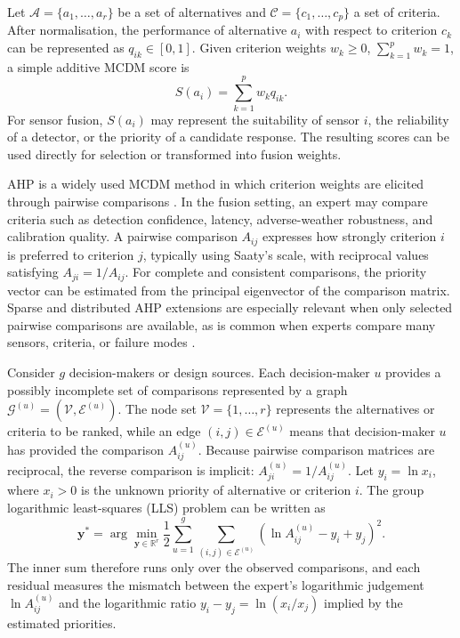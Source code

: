 \documentclass{ieeeaccess}
\begin{document}
Let \(\mathcal{A}=\{a_1,\ldots,a_r\}\) be a set of alternatives and \(\mathcal{C}=\{c_1,\ldots,c_p\}\) a set of criteria. After normalisation, the performance of alternative \(a_i\) with respect to criterion \(c_k\) can be represented as \(q_{ik}\in[0,1]\). Given criterion weights \(w_k\geq 0\), \(\sum_{k=1}^{p} w_k=1\), a simple additive MCDM score is
\begin{equation}
S(a_i)=\sum_{k=1}^{p} w_k q_{ik}.
\label{eq:mcdm-score}
\end{equation}
For sensor fusion, \(S(a_i)\) may represent the suitability of sensor \(i\), the reliability of a detector, or the priority of a candidate response. The resulting scores can be used directly for selection or transformed into fusion weights.

AHP is a widely used MCDM method in which criterion weights are elicited through pairwise comparisons \cite{saaty_analytic_1987}. In the fusion setting, an expert may compare criteria such as detection confidence, latency, adverse-weather robustness, and calibration quality. A pairwise comparison \(A_{ij}\) expresses how strongly criterion \(i\) is preferred to criterion \(j\), typically using Saaty's scale, with reciprocal values satisfying \(A_{ji}=1/A_{ij}\). For complete and consistent comparisons, the priority vector can be estimated from the principal eigenvector of the comparison matrix. Sparse and distributed AHP extensions are especially relevant when only selected pairwise comparisons are available, as is common when experts compare many sensors, criteria, or failure modes \cite{oliva_sparse_distributed_2017,bozoki_fulop_ronyai_2010,bozoki_optimality_2019}.

Consider \(g\) decision-makers or design sources. Each decision-maker \(u\) provides a possibly incomplete set of comparisons represented by a graph \(\mathcal{G}^{(u)}=(\mathcal{V},\mathcal{E}^{(u)})\). The node set \(\mathcal{V}=\{1,\ldots,r\}\) represents the alternatives or criteria to be ranked, while an edge \((i,j)\in\mathcal{E}^{(u)}\) means that decision-maker \(u\) has provided the comparison \(A_{ij}^{(u)}\). Because pairwise comparison matrices are reciprocal, the reverse comparison is implicit: \(A_{ji}^{(u)}=1/A_{ij}^{(u)}\). Let \(y_i=\ln x_i\), where \(x_i>0\) is the unknown priority of alternative or criterion \(i\). The group logarithmic least-squares (LLS) problem can be written as
\begin{equation}
\bm{y}^{*}=
\arg\min_{\bm{y}\in\mathbb{R}^{r}}
\frac{1}{2}
\sum_{u=1}^{g}
\sum_{(i,j)\in\mathcal{E}^{(u)}}
\left(\ln A_{ij}^{(u)}-y_i+y_j\right)^2 .
\label{eq:lls-ahp}
\end{equation}
The inner sum therefore runs only over the observed comparisons, and each residual measures the mismatch between the expert's logarithmic judgement \(\ln A_{ij}^{(u)}\) and the logarithmic ratio \(y_i-y_j=\ln(x_i/x_j)\) implied by the estimated priorities.
\end{document}
